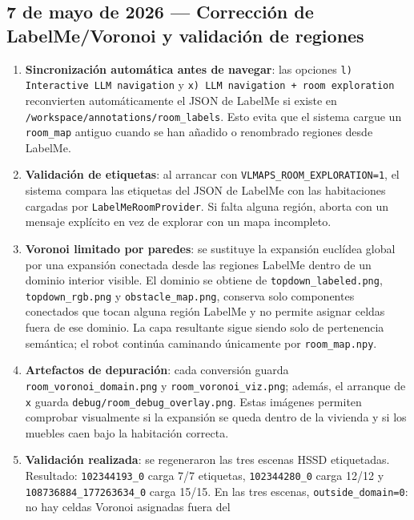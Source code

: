 \documentclass[11pt,a4paper]{article}
\begin{document}
\subsection*{7 de mayo de 2026 --- Corrección de LabelMe/Voronoi y validación de regiones}

\begin{enumerate}
  \item \textbf{Sincronización automática antes de navegar}: las opciones
        \texttt{l) Interactive LLM navigation} y \texttt{x) LLM navigation +
        room exploration} reconvierten automáticamente el JSON de LabelMe si
        existe en \texttt{/workspace/annotations/room\_labels}. Esto evita que
        el sistema cargue un \texttt{room\_map} antiguo cuando se han añadido
        o renombrado regiones desde LabelMe.
  \item \textbf{Validación de etiquetas}: al arrancar con
        \texttt{VLMAPS\_ROOM\_EXPLORATION=1}, el sistema compara las etiquetas
        del JSON de LabelMe con las habitaciones cargadas por
        \texttt{LabelMeRoomProvider}. Si falta alguna región, aborta con un
        mensaje explícito en vez de explorar con un mapa incompleto.
  \item \textbf{Voronoi limitado por paredes}: se sustituye la expansión
        euclídea global por una expansión conectada desde las regiones LabelMe
        dentro de un dominio interior visible. El dominio se obtiene de
        \texttt{topdown\_labeled.png}, \texttt{topdown\_rgb.png} y
        \texttt{obstacle\_map.png}, conserva solo componentes conectados que
        tocan alguna región LabelMe y no permite asignar celdas fuera de ese
        dominio. La capa resultante sigue siendo solo de pertenencia semántica;
        el robot continúa caminando únicamente por \texttt{room\_map.npy}.
  \item \textbf{Artefactos de depuración}: cada conversión guarda
        \texttt{room\_voronoi\_domain.png} y
        \texttt{room\_voronoi\_viz.png}; además, el arranque de \texttt{x}
        guarda \texttt{debug/room\_debug\_overlay.png}. Estas imágenes permiten
        comprobar visualmente si la expansión se queda dentro de la vivienda y
        si los muebles caen bajo la habitación correcta.
  \item \textbf{Validación realizada}: se regeneraron las tres escenas HSSD
        etiquetadas. Resultado: \texttt{102344193\_0} carga 7/7 etiquetas,
        \texttt{102344280\_0} carga 12/12 y
        \texttt{108736884\_177263634\_0} carga 15/15. En las tres escenas,
        \texttt{outside\_domain=0}: no hay celdas Voronoi asignadas fuera del

\end{enumerate}
\end{document}
